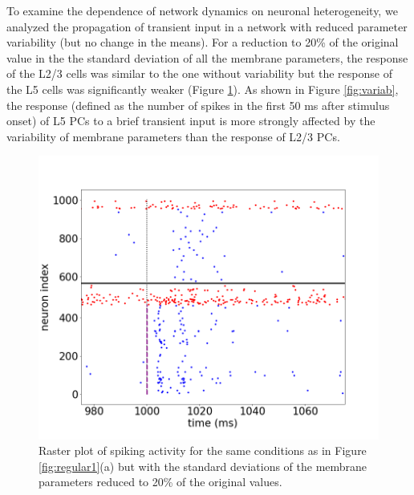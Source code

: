 To examine the dependence of network dynamics on neuronal heterogeneity, we analyzed the propagation of transient input in a network with reduced  parameter variability (but no change in the means). For a reduction to 20\% of the original value in the the standard deviation of all the membrane parameters, the response of the L2/3 cells was similar to the one without variability but the response of the L5 cells was significantly weaker (Figure \ref{fig:rp80}). As shown in Figure \ref{fig:variab}, the response (defined as the number of spikes in the first 50 ms after stimulus onset) of L5 PCs to a brief transient input is more strongly affected by the variability of membrane parameters than the response of L2/3 PCs. \\

\begin{figure}[H]
    \centering
    \includegraphics[scale=0.25]{regularmod3.png}
    \caption{Raster plot of spiking activity for the same conditions as in Figure \ref{fig:regular1}(a) but with the standard deviations of the membrane parameters reduced to 20\% of the original values.}
    \label{fig:rp80}
\end{figure}

